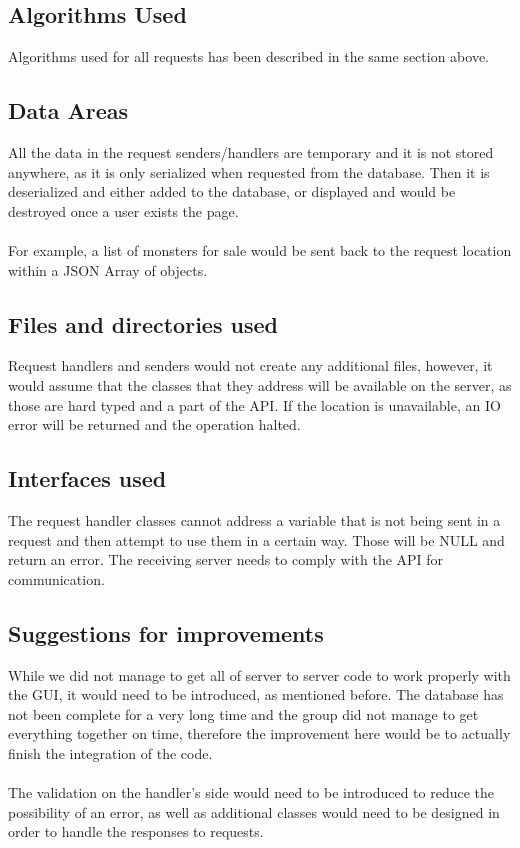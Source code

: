 \documentclass[titlepage]{article}
\begin{document}
{\subsection{Algorithms Used}
Algorithms used for all requests has been described in the same section above.
\subsection{Data Areas}
All the data in the request senders/handlers are temporary and it is not stored anywhere, as it is only serialized when requested from the database. Then it is deserialized and either added to the database, or displayed and would be destroyed once a user exists the page.
\\
\\
For example, a list of monsters for sale would be sent back to the request location within a JSON Array of objects.
\subsection {Files and directories used}
Request handlers and senders would not create any additional files, however, it would assume that the classes that they address will be available on the server, as those are hard typed and a part of the API. If the location is unavailable, an IO error will be returned and the operation halted.
\subsection {Interfaces used}
The request handler classes cannot address a variable that is not being sent in a request and then attempt to use them in a certain way. Those will be NULL and return an error. The receiving server needs to comply with the API for communication.
\subsection {Suggestions for improvements}
While we did not manage to get all of server to server code to work properly with the GUI, it would need to be introduced, as mentioned before. The database has not been complete for a very long time and the group did not manage to get everything together on time, therefore the improvement here would be to actually finish the integration of the code.
\\
\\
The validation on the handler's side would need to be introduced to reduce the possibility of an error, as well as additional classes would need to be designed in order to handle the responses to requests.
}
\end{document}
